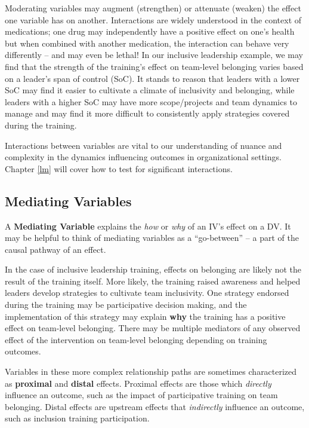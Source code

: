 \documentclass[]{book}
\begin{document}
Moderating variables may augment (strengthen) or attenuate (weaken) the effect one variable has on another. Interactions are widely understood in the context of medications; one drug may independently have a positive effect on one's health but when combined with another medication, the interaction can behave very differently -- and may even be lethal! In our inclusive leadership example, we may find that the strength of the training's effect on team-level belonging varies based on a leader's span of control (SoC). It stands to reason that leaders with a lower SoC may find it easier to cultivate a climate of inclusivity and belonging, while leaders with a higher SoC may have more scope/projects and team dynamics to manage and may find it more difficult to consistently apply strategies covered during the training.

Interactions between variables are vital to our understanding of nuance and complexity in the dynamics influencing outcomes in organizational settings. Chapter \ref{lm} will cover how to test for significant interactions.

\hypertarget{mediating-variables}{%
\subsection{Mediating Variables}\label{mediating-variables}}

A \textbf{Mediating Variable} explains the \emph{how} or \emph{why} of an IV's effect on a DV. It may be helpful to think of mediating variables as a ``go-between'' -- a part of the causal pathway of an effect.

In the case of inclusive leadership training, effects on belonging are likely not the result of the training itself. More likely, the training raised awareness and helped leaders develop strategies to cultivate team inclusivity. One strategy endorsed during the training may be participative decision making, and the implementation of this strategy may explain \textbf{why} the training has a positive effect on team-level belonging. There may be multiple mediators of any observed effect of the intervention on team-level belonging depending on training outcomes.

Variables in these more complex relationship paths are sometimes characterized as \textbf{proximal} and \textbf{distal} effects. Proximal effects are those which \emph{directly} influence an outcome, such as the impact of participative training on team belonging. Distal effects are upstream effects that \emph{indirectly} influence an outcome, such as inclusion training participation.
\end{document}
